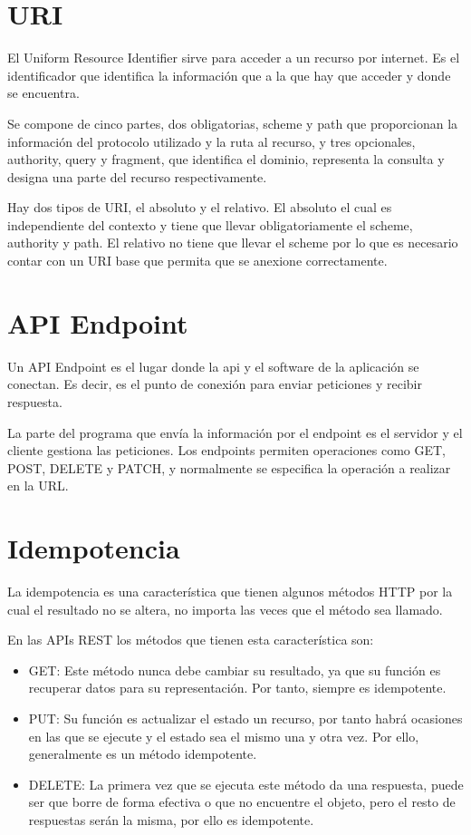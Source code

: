 \section{URI}
El Uniform Resource Identifier \cite{uri} sirve para acceder a un recurso por internet. Es el identificador que identifica la información que a la que hay que acceder y donde se encuentra. 

Se compone de cinco partes, dos obligatorias, scheme y path que proporcionan la información del protocolo utilizado y la ruta al recurso, y tres opcionales, authority, query y fragment, que identifica el dominio, representa la consulta y designa una parte del recurso respectivamente.

Hay dos tipos de URI, el absoluto y el relativo. El absoluto el cual es independiente del contexto y tiene que llevar obligatoriamente el scheme, authority y path. 
El relativo no tiene que llevar el scheme por lo que es necesario contar con un URI base que permita que se anexione correctamente.

\section{API Endpoint}
Un API Endpoint \cite{endpoint} es el lugar donde la api y el software de la aplicación se conectan. Es decir, es el punto de conexión para enviar peticiones y recibir respuesta.

La parte del programa que envía la información por el endpoint es el servidor y el cliente gestiona las peticiones. Los endpoints permiten operaciones como GET, POST, DELETE y PATCH, y normalmente se especifica la operación a realizar en la URL.
\newpage
\section{Idempotencia}
La idempotencia \cite{idempotent} es una característica que tienen algunos métodos HTTP por la cual el resultado no se altera, no importa las veces que el método sea llamado.

En las APIs REST los métodos que tienen esta característica son:
\begin{itemize}
\tightlist
    \item GET: Este método nunca debe cambiar su resultado, ya que su función es recuperar datos para su representación. Por tanto, siempre es idempotente.
    \item PUT: Su función es actualizar el estado un recurso, por tanto habrá ocasiones en las que se ejecute y el estado sea el mismo una y otra vez. Por ello, generalmente es un método idempotente.
    \item DELETE: La primera vez que se ejecuta este método da una respuesta, puede ser que borre de forma efectiva o que no encuentre el objeto, pero el resto de respuestas serán la misma, por ello es idempotente.
\end{itemize}

